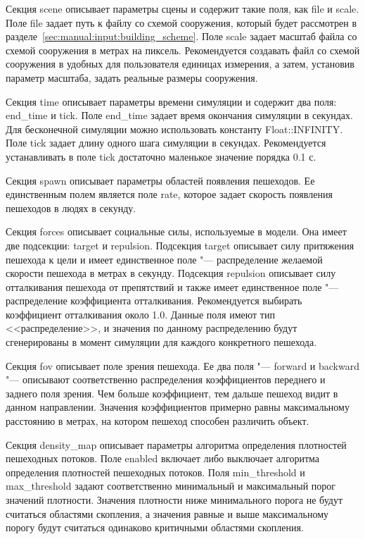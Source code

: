 Секция scene описывает параметры сцены и содержит такие поля, как file и scale.
Поле file задает путь к файлу со схемой сооружения, который будет рассмотрен в разделе~\ref{sec:manual:input:building_scheme}.
Поле scale задает масштаб файла со схемой сооружения в метрах на пиксель.
Рекомендуется создавать файл со схемой сооружения в удобных для пользователя единицах измерения, а затем, установив параметр масштаба, задать реальные размеры сооружения.

Секция time описывает параметры времени симуляции и содержит два поля: end\_time и tick.
Поле end\_time задает время окончания симуляции в секундах. Для бесконечной симуляции можно использовать константу Float::INFINITY.
Поле tick задает длину одного шага симуляции в секундах. Рекомендуется устанавливать в поле tick достаточно маленькое значение порядка 0.1 с.

Секция spawn описывает параметры областей появления пешеходов. Ее единственным полем является поле rate, которое задает скорость появления пешеходов в людях в секунду.

Секция forces описывает социальные силы, используемые в модели.
Она имеет две подсекции: target и repulsion.
Подсекция target описывает силу притяжения пешехода к цели и имеет единственное поле "--- распределение желаемой скорости пешехода в метрах в секунду.
Подсекция repulsion описывает силу отталкивания пешехода от препятствий и также имеет единственное поле "--- распределение коэффициента отталкивания.
Рекомендуется выбирать коэффициент отталкивания около 1.0.
Данные поля имеют тип <<распределение>>, и значения по данному распределению будут сгенерированы в момент симуляции для каждого конкретного пешехода.

Секция fov описывает поле зрения пешехода.
Ее два поля "--- forward и backward "--- описывают соответственно распределения коэффициентов переднего и заднего поля зрения.
Чем больше коэффициент, тем дальше пешеход видит в данном направлении.
Значения коэффициентов примерно равны максимальному расстоянию в метрах, на котором пешеход способен различить объект.

Секция density\_map описывает параметры алгоритма определения плотностей пешеходных потоков.
Поле enabled включает либо выключает алгоритма определения плотностей пешеходных потоков.
Поля min\_threshold и max\_threshold задают соответственно минимальный и максимальный порог значений плотности.
Значения плотности ниже минимального порога не будут считаться областями скопления,
а значения равные и выше максимальному порогу будут считаться одинаково критичными областями скопления.

